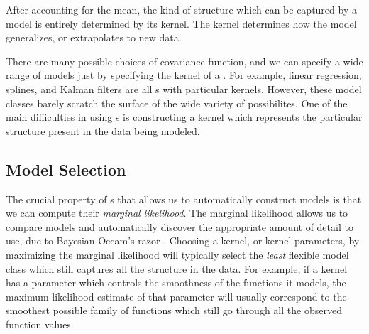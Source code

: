 After accounting for the mean, the kind of structure which can be captured by a \gp{} model is entirely determined by its kernel.  The kernel determines how the model generalizes, or extrapolates to new data.

There are many possible choices of covariance function, and we can specify a wide range of models just by specifying the kernel of a \gp{}.
For example, 
linear regression, splines, 
and Kalman filters are all \gp{}s with particular kernels.
However, these model classes barely scratch the surface of the wide variety of possibilites.
%
One of the main difficulties in using \gp{}s is constructing a kernel which represents the particular structure present in the data being modeled.


\subsection{Model Selection}

The crucial property of \gp{}s that allows us to automatically construct models is that we can compute their \emph{marginal likelihood}.
The marginal likelihood allows us to compare models and automatically discover the appropriate amount of detail to use, due to Bayesian Occam's razor \citep{rasmussen2001occam,mackay2003information}.
Choosing a kernel, or kernel parameters, by maximizing the marginal likelihood will typically select the \emph{least} flexible model class which still captures all the structure in the data.
For example, if a kernel has a parameter which controls the smoothness of the functions it models, the maximum-likelihood estimate of that parameter will usually correspond to the smoothest possible family of functions which still go through all the observed function values.

